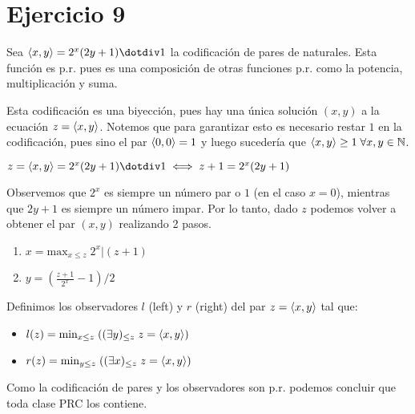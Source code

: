 \section*{Ejercicio 9}

Sea $\tupla{x}{y} = 2^x (2y + 1) \dotdiv 1$ la codificación de pares de naturales. Esta función es p.r. pues es una composición de otras funciones p.r. como la potencia, multiplicación y suma.

Esta codificación es una biyección, pues hay una única solución $(x, y)$ a la ecuación $z = \langle x, y \rangle$. Notemos que para garantizar esto es necesario restar $1$ en la codificación, pues sino el par $\langle 0, 0 \rangle = 1$ y luego sucedería que $\langle x, y \rangle \geq 1 \; \forall x,y \in \mathbb{N}$.

$z = \tupla{x}{y} = 2^x (2y + 1) \dotdiv 1 \iff z + 1 = 2^x (2y + 1)$

Observemos que $2^x$ es siempre un número par o $1$ (en el caso $x = 0$), mientras que $2y + 1$ es siempre un número impar. Por lo tanto, dado $z$ podemos volver a obtener el par $(x, y)$ realizando 2 pasos.

\begin{enumerate}
    \item $x = \text{max}_{x \leq z} \; 2^x | (z + 1)$
    \item $y = (\frac{z + 1}{2^x} - 1) / 2$
\end{enumerate}

Definimos los observadores $l$ (left) y $r$ (right) del par $z = \langle x, y \rangle$ tal que:

\begin{itemize}
    \item $l(z) = \text{min}_{x \leq z} \; ((\exists y)_{\leq z} \; z = \langle x, y \rangle)$
    \item $r(z) = \text{min}_{y \leq z} \; ((\exists x)_{\leq z} \; z = \langle x, y \rangle)$
\end{itemize}

Como la codificación de pares y los observadores son p.r. podemos concluir que toda clase PRC los contiene.
